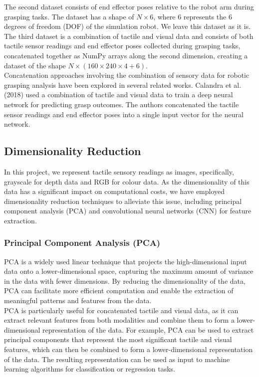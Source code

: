 \documentclass[11pt, a4paper]{report}
\begin{document}
The second dataset consists of end effector poses relative to the robot arm during grasping tasks. The dataset has a shape of $N\times6$, where $6$ represents the 6 degrees of freedom (DOF) of the simulation robot. We leave this dataset as it is.\\

The third dataset is a combination of tactile and visual data and consists of both tactile sensor readings and end effector poses collected during grasping tasks, concatenated together as NumPy arrays along the second dimension, creating a dataset of the shape $N\times(160\times240\times4+6)$.\\

Concatenation approaches involving the combination of sensory data for robotic grasping analysis have been explored in several related works. Calandra et al. (2018) \cite{Calandra_2018} used a combination of tactile and visual data to train a deep neural network for predicting grasp outcomes. The authors concatenated the tactile sensor readings and end effector poses into a single input vector for the neural network.


\subsection{Dimensionality Reduction}\label{sec:4.4.2}
In this project, we represent tactile sensory readings as images, specifically, grayscale for depth data and RGB for colour data. As the dimensionality of this data has a significant impact on computational costs, we have employed dimensionality reduction techniques to alleviate this issue, including principal component analysis (PCA) and convolutional neural networks (CNN) for feature extraction.


\subsubsection{Principal Component Analysis (PCA)}\label{sec:4.4.2.1}
PCA is a widely used linear technique that projects the high-dimensional input data onto a lower-dimensional space, capturing the maximum amount of variance in the data with fewer dimensions. By reducing the dimensionality of the data, PCA can facilitate more efficient computation and enable the extraction of meaningful patterns and features from the data.\\

PCA is particularly useful for concatenated tactile and visual data, as it can extract relevant features from both modalities and combine them to form a lower-dimensional representation of the data. For example, PCA can be used to extract principal components that represent the most significant tactile and visual features, which can then be combined to form a lower-dimensional representation of the data. The resulting representation can be used as input to machine learning algorithms for classification or regression tasks.\\
\end{document}
